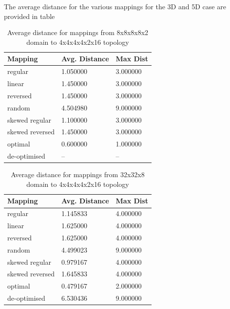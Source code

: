 \documentclass{acm_proc_article-sp}
\begin{document}
The average distance for the various mappings for the 3D and 5D case are provided in table


\begin{table}
  \caption{Average distance for mappings from 8x8x8x8x2 domain to 4x4x4x4x2x16 topology}
  {\footnotesize
    \begin{tabular}{| l | l | p{1.5cm} |}
    \hline
    Mapping         & Avg. Distance & Max Dist\\ \hline
    regular         & 1.050000 & 3.000000\\ \hline
    linear          & 1.450000 & 3.000000\\ \hline
    reversed        & 1.450000 & 3.000000\\ \hline
    random          & 4.504980 & 9.000000\\ \hline
    skewed regular  & 1.100000 & 3.000000\\ \hline
    skewed reversed & 1.450000 & 3.000000\\ \hline
    optimal         & 0.600000 & 1.000000\\ \hline
    de-optimised    & --       & --      \\ \hline
    \hline
    \end{tabular}
  }
\end{table}


\begin{table}
  \caption{Average distance for mappings from 32x32x8 domain to 4x4x4x4x2x16 topology}
  {\footnotesize
    \begin{tabular}{| l | l | p{1.5cm} |}
    \hline
    Mapping         & Avg. Distance & Max Dist\\ \hline
    regular         & 1.145833 & 4.000000\\ \hline
    linear          & 1.625000 & 4.000000\\ \hline
    reversed        & 1.625000 & 4.000000\\ \hline
    random          & 4.499023 & 9.000000\\ \hline
    skewed regular  & 0.979167 & 4.000000\\ \hline
    skewed reversed & 1.645833 & 4.000000\\ \hline
    optimal         & 0.479167 & 2.000000\\ \hline
    de-optimised    & 6.530436 & 9.000000\\ \hline
    \hline
    \end{tabular}
  }
\end{table}
\end{document}
